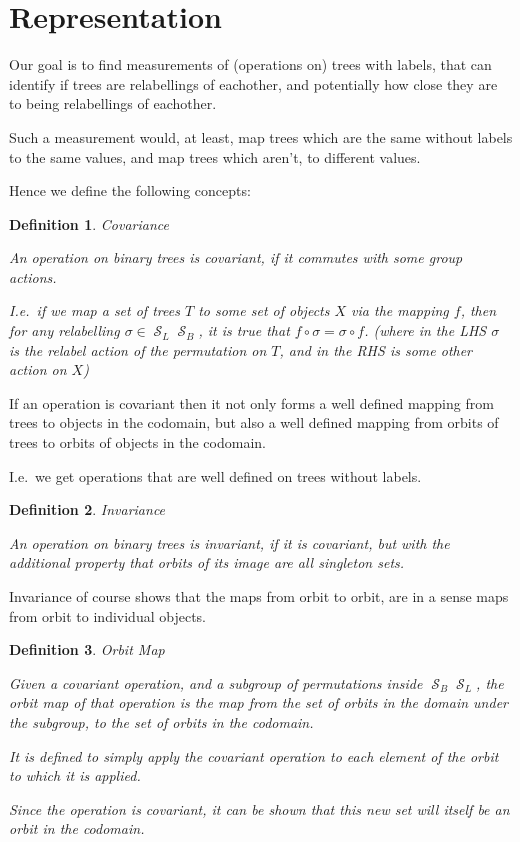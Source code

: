 \documentclass[10pt,a4paper]{report}
\DeclareMathOperator{\S}{\mathcal{S}}
\newtheorem{definition}{Definition}
\begin{document}
\section{Representation}

Our goal is to find measurements of (operations on) trees with labels, that can identify if trees are
relabellings of eachother, and potentially how close they are to being
relabellings of eachother.

Such a measurement would, at least, map trees which are the same without labels to the
same values, and map trees which aren't, to different values.

Hence we define the following concepts:

\begin{definition} Covariance

	An operation on binary trees is covariant, if it commutes with some group actions.

	I.e.\ if we map a set of trees $T$ to some set of objects $X$ via the
	mapping $f$, then for any relabelling $\sigma \in \S_L\S_B$, it is true
	that $f \circ \sigma = \sigma \circ f$. (where in the LHS $\sigma$ is the
	relabel action of the permutation on $T$, and in the RHS is some other action on $X$)
\end{definition}

If an operation is covariant then it not only forms a well defined mapping from
trees to objects in the codomain, but also a well defined mapping
from orbits of trees to orbits of objects in the codomain.

I.e.\ we get operations that are well defined on trees without labels.

\begin{definition} Invariance

	An operation on binary trees is invariant, if it is covariant, but with the
	additional property that orbits of its image are all singleton sets.
\end{definition}

Invariance of course shows that the maps from orbit to orbit, are in a sense
maps from orbit to individual objects.

\begin{definition} Orbit Map

	Given a covariant operation, and a subgroup of permutations inside
	$\S_B\S_L$, the orbit map of that operation is the map from the set
	of orbits in the domain under the subgroup, to the set of orbits in the
	codomain.

	It is defined to simply apply the covariant operation to each element of
	the orbit to which it is applied.

	Since the operation is covariant, it can be shown that this new set will
	itself be an orbit in the codomain.
\end{definition}
\end{document}
